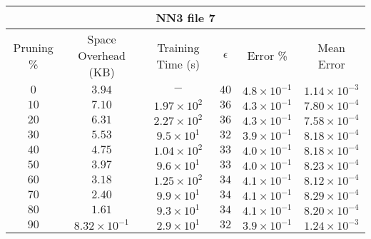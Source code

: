 \begin{adjustwidth}{0cm}{}
\begin{tabular}{cccccc}
\hline
\multicolumn{6}{c}{NN3 file 7} \\
\toprule
Pruning \% & Space Overhead (KB) & Training Time (s) & $\epsilon$ & Error \% & Mean Error\\
\midrule
$0$ & $3.94$ & $-$ & $40$ & $4.8 \times 10^{-1}$ & $1.14 \times 10^{-3}$\\
$10$ & $7.10$ & $1.97  \times 10^{2}$ & $36$ & $4.3 \times 10^{-1}$ & $7.80 \times 10^{-4}$\\
$20$ & $6.31$ & $2.27 \times 10^{2}$ & $36$ & $4.3 \times 10^{-1}$ & $7.58 \times 10^{-4}$\\
$30$ & $5.53$ & $9.5 \times 10^{1}$ & $32$ & $3.9 \times 10^{-1}$ & $8.18 \times 10^{-4}$\\
$40$ & $4.75$ & $1.04 \times 10^{2}$ & $33$ & $4.0 \times 10^{-1}$ & $8.18 \times 10^{-4}$\\
$50$ & $3.97$ & $9.6 \times 10^{1}$ & $33$ & $4.0 \times 10^{-1}$ & $8.23 \times 10^{-4}$\\
$60$ & $3.18$ & $1.25 \times 10^{2}$ & $34$ & $4.1 \times 10^{-1}$ & $8.12 \times 10^{-4}$\\
$70$ & $2.40$ & $9.9 \times 10^{1}$ & $34$ & $4.1 \times 10^{-1}$ & $8.29 \times 10^{-4}$\\
$80$ & $1.61$ & $9.3 \times 10^{1}$ & $34$ & $4.1 \times 10^{-1}$ & $8.20 \times 10^{-4}$\\
$90$ & $8.32 \times 10^{-1}$ & $2.9 \times 10^{1}$ & $32$ & $3.9 \times 10^{-1}$ & $1.24 \times 10^{-3}$\\
\bottomrule
\end{tabular}
\end{adjustwidth}

\par\null\par
\par\null\par

